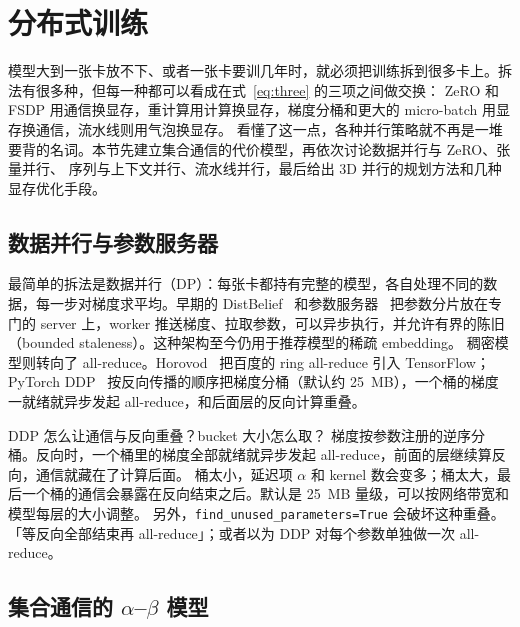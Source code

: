 \section{分布式训练}
\label{sec:train}

模型大到一张卡放不下、或者一张卡要训几年时，就必须把训练拆到很多卡上。拆法有很多种，但每一种都可以看成在式~\eqref{eq:three} 的三项之间做交换：
ZeRO 和 FSDP 用通信换显存，重计算用计算换显存，梯度分桶和更大的 micro-batch 用显存换通信，流水线则用气泡换显存。
看懂了这一点，各种并行策略就不再是一堆要背的名词。本节先建立集合通信的代价模型，再依次讨论数据并行与 ZeRO、张量并行、
序列与上下文并行、流水线并行，最后给出 3D 并行的规划方法和几种显存优化手段。

\subsection{数据并行与参数服务器}

最简单的拆法是数据并行（DP）：每张卡都持有完整的模型，各自处理不同的数据，每一步对梯度求平均。早期的 DistBelief~\cite{dean2012large} 和参数服务器~\cite{li2014scaling}
把参数分片放在专门的 server 上，worker 推送梯度、拉取参数，可以异步执行，并允许有界的陈旧（bounded staleness）。这种架构至今仍用于推荐模型的稀疏 embedding。
稠密模型则转向了 all-reduce。Horovod~\cite{sergeev2018horovod} 把百度的 ring all-reduce 引入 TensorFlow；PyTorch DDP~\cite{li2020pytorch}
按反向传播的顺序把梯度分桶（默认约 25~MB），一个桶的梯度一就绪就异步发起 all-reduce，和后面层的反向计算重叠。

\begin{qa}{DDP 怎么让通信与反向重叠？bucket 大小怎么取？}
\ans 梯度按参数注册的逆序分桶。反向时，一个桶里的梯度全部就绪就异步发起 all-reduce，前面的层继续算反向，通信就藏在了计算后面。
桶太小，延迟项 $\alpha$ 和 kernel 数会变多；桶太大，最后一个桶的通信会暴露在反向结束之后。默认是 25~MB 量级，可以按网络带宽和模型每层的大小调整。
另外，\texttt{find\_unused\_parameters=True} 会破坏这种重叠。
\wrong 「等反向全部结束再 all-reduce」；或者以为 DDP 对每个参数单独做一次 all-reduce。
\end{qa}

\subsection{集合通信的 $\alpha$--$\beta$ 模型}

